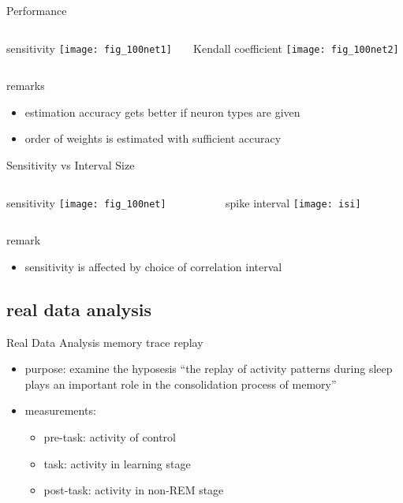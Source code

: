 \documentclass[fleqn,aspectratio=1610]{beamer}
\begin{document}
\begin{frame}[label={sec:org49fa4c1}]{Performance}
\begin{columns}
\begin{column}{0.5\columnwidth}
\centering
sensitivity
\texttt{[image: fig\_100net1]}
\end{column}
\begin{column}{0.5\columnwidth}
\centering
Kendall coefficient
\texttt{[image: fig\_100net2]}
\end{column}
\end{columns}
\begin{alertblock}{remarks}
\begin{itemize}
\item estimation accuracy gets better if neuron types are given
\item order of weights is estimated with sufficient accuracy
\end{itemize}
\end{alertblock}
\end{frame}
\begin{frame}[label={sec:org1fac40a}]{Sensitivity vs Interval Size}
\begin{columns}
\begin{column}{0.5\columnwidth}
\centering
sensitivity
\texttt{[image: fig\_100net]}
\end{column}
\begin{column}{0.5\columnwidth}
\centering
spike interval
\texttt{[image: isi]}
\end{column}
\end{columns}
\begin{alertblock}{remark}
\begin{itemize}
\item sensitivity is affected by choice of
correlation interval
\end{itemize}
\end{alertblock}
\end{frame}
\subsection{real data analysis}
\label{sec:org8064bf4}
\begin{frame}[label={sec:org74d7fbe}]{Real Data Analysis}
memory trace replay
\parencites{WilsonMcNaughton1994,TatsunoLipaMcNaughton2006}

\begin{itemize}
\item purpose: 
examine the hyposesis ``the replay of activity patterns during sleep 
plays an important role in the consolidation process of memory''
\item measurements:
\begin{itemize}
\item pre-task: activity of control
\item task: activity in learning stage
\item post-task: activity in non-REM stage
\end{itemize}
\end{itemize}
\end{frame}
\end{document}
